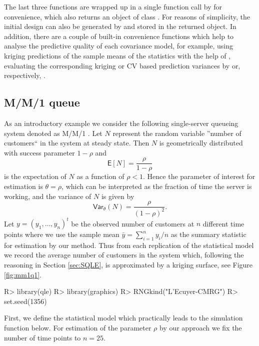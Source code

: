 \documentclass[article, nojss]{jss}
\numberwithin{equation}{section}			%
\newcommand{\var}{\mathsf{Var}_{\theta}} %
\begin{document}
%
The last three functions are wrapped up in a single function call by
 for convenience, which also returns an object of class
. For reasons of simplicity, the initial design can also be
generated by  and stored in the returned object. In addition,
there are a couple of built-in convenience functions which help to analyse the
predictive quality of each covariance model, for example, using
kriging predictions of the sample means of the statistics with the help
of , evaluating the corresponding kriging or CV
based prediction variances by  or, respectively,
.
%
\subsection{M/M/1 queue}\label{subsec:mmq}
As an introductory example we consider the following single-server queueing
system denoted as M/M/1 \citep[see, e.\,g.][]{Beers2003}. Let $N$ represent
the random variable ''number of customers`` in the system at steady state. Then
$N$ is geometrically distributed with success parameter $1-\rho$ and
\begin{equation*}
  \mathsf{E}[N]=\frac{\rho}{1-\rho}
\end{equation*}
is the expectation of $N$ as a function of $\rho<1$. Hence the parameter of
interest for estimation is $\theta=\rho$, which can be interpreted as the fraction of time the server is
working, and the variance of $N$ is given by
\[
  \var(N) = \frac{\rho}{(1-\rho)^2}.
\]
%
Let $y=(y_1,\ldots,y_n)^{t}$ be the observed number of customers at $n$
different time points where we use the sample mean $\bar{y}=\sum_{i=1}^n y_i/n$
as the summary statistic for estimation by our method. Thus from each
replication of the statistical model we record the average number of customers
in the system which, following the reasoning in Section \ref{sec:SQLE}, is approximated
by a kriging surface, see Figure \ref{fig:mm1q1}.
\begin{Schunk}
\begin{Sinput}
R> library(qle)
R> library(graphics)
R> RNGkind("L'Ecuyer-CMRG")
R> set.seed(1356)
\end{Sinput}
\end{Schunk}
First, we define the statistical model which practically leads to the
simulation function below. For estimation of the parameter $\rho$ by our
approach we fix the number of time points to $n=25$.
\end{document}
